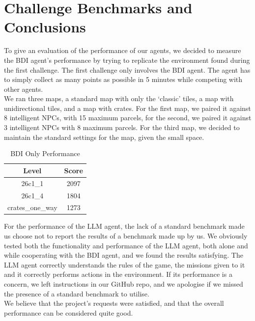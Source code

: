 \documentclass[11pt,a4paper]{article}
\begin{document}
\section{Challenge Benchmarks and Conclusions}
To give an evaluation of the performance of our agents, we decided to measure the BDI agent's performance by trying to replicate the environment found during the first challenge.
The first challenge only involves the BDI agent. The agent has to simply collect as many points as possible in 5 minutes while competing with other agents.
\\We ran three maps, a standard map with only the `classic' tiles, a map with unidirectional tiles, and a map with crates.
For the first map, we paired it against 8 intelligent NPCs, with 15 maximum parcels, for the second, we paired it against 3 intelligent NPCs with 8 maximum parcels.
For the third map, we decided to maintain the standard settings for the map, given the small space.
\begin{table}[H]
\centering
\begin{minipage}{.45\linewidth}
    \centering
    \caption{BDI Only Performance}
    \begin{tabular}{cc}
        \toprule
        \textbf{Level} & \textbf{Score} \\
        \midrule
        {26c1\_1} & {2097} \\
        {26c1\_4} & {1804} \\
        {crates\_one\_way} & {1273} \\
        \bottomrule
    \end{tabular}
\end{minipage}
\hfill
\end{table}
For the performance of the LLM agent, the lack of a standard benchmark made us choose not to report the results of a benchmark made up by us.
We obviously tested both the functionality and performance of the LLM agent, both alone and while cooperating with the BDI agent, and we found the results satisfying.
The LLM agent correctly understands the rules of the game, the missions given to it and it correctly performs actions in the environment.
If its performance is a concern, we left instructions in our GitHub repo, and we apologise if we missed the presence of a standard benchmark to utilise.
\\We believe that the project's requests were satisfied, and that the overall performance can be considered quite good.
\end{document}
